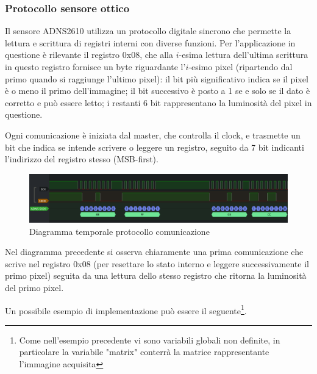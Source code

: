 \documentclass[12pt]{article}
\begin{document}
        \subsubsection{Protocollo sensore ottico}\label{adns2610_protocol}
        
        Il sensore ADNS2610 utilizza un protocollo digitale sincrono che permette la lettura e scrittura di registri interni con diverse funzioni. Per l'applicazione in questione è rilevante il registro 0x08, che alla $i$-esima lettura dell'ultima scrittura in questo registro fornisce un byte riguardante l'$i$-esimo pixel (ripartendo dal primo quando si raggiunge l'ultimo pixel): il bit più significativo  indica se il pixel è o meno il primo dell'immagine; il bit successivo è posto a 1 se e solo se il dato è corretto e può essere letto; i restanti 6 bit rappresentano la luminosità del pixel in questione.
        
        Ogni comunicazione è iniziata dal master, che controlla il clock, e trasmette un bit che indica se intende scrivere o leggere un registro, seguito da 7 bit indicanti l'indirizzo del registro stesso (MSB-first).
        
        \begin{figure}[h]
        \centering
            \includegraphics[width=\textwidth]{Draws/Logic_analyzer_ADNS2610.png}
            \caption{Diagramma temporale protocollo comunicazione}
        \end{figure}
        
        Nel diagramma precedente si osserva chiaramente una prima comunicazione che scrive nel registro 0x08 (per resettare lo stato interno e leggere successivamente il primo pixel) seguita da una lettura dello stesso registro che ritorna la luminosità del primo pixel.
      
        \vspace{0.7cm}
        Un possibile esempio di implementazione può essere il seguente\footnote{Come nell'esempio precedente vi sono variabili globali non definite, in particolare la variabile "matrix" conterrà la matrice rappresentante l'immagine acquisita}.
        
\end{document}
